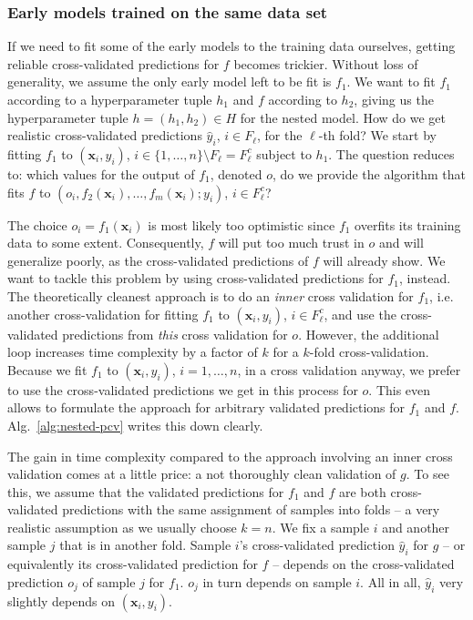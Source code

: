 \subsubsection{Early models trained on the same data set}
If we need to fit some of the early models to the training data ourselves, getting reliable 
cross-validated predictions
for $f$ becomes trickier. Without loss of generality, we assume the only early model left to be 
fit 
is $f_1$. We want to fit $f_1$ according to a hyperparameter tuple $h_1$ and $f$ according to $h_2$, 
giving us the hyperparameter tuple $h = (h_1, h_2) \in H$ for the nested model. How do 
we get realistic cross-validated predictions $\hat{y}_i$, $i \in F_\ell$, for the $\ell$-th fold? 
We start by fitting $f_1$ to $(\mathbf{x}_i, y_i)$, $i \in \{ 1, \ldots, n \} \setminus F_\ell = F_\ell^c$ 
subject to $h_1$.
The question reduces to: which values for the output of $f_1$, denoted $o$, do we provide the 
algorithm that fits $f$ to $(o_i, f_2(\mathbf{x}_i), \dots, f_m(\mathbf{x}_i); y_i)$, $i \in 
F_\ell^c$?

The choice $o_i = f_1(\mathbf{x}_i)$ is most likely too optimistic since $f_1$ overfits its training 
data to some extent. Consequently, $f$ will put too much trust in $o$ and will generalize poorly, 
as the cross-validated predictions of $f$ will already show. We want to tackle this problem by 
using cross-validated predictions for $f_1$, instead. The theoretically cleanest approach 
is to do an \textit{inner} cross validation for $f_1$, i.e. another cross-validation for fitting 
$f_1$ to $(\mathbf{x}_i, y_i)$, $i \in F_\ell^c$, and use the cross-validated predictions from \textit{this} 
cross validation for $o$. However, the additional loop increases time complexity by a factor of $k$ 
for a $k$-fold cross-validation. Because we fit $f_1$ to $(\mathbf{x}_i, y_i)$, $i = 1, \ldots, n$, 
in a cross validation anyway, we prefer to use the cross-validated predictions we get in this 
process for $o$. This even allows to formulate the approach for arbitrary validated predictions 
for $f_1$ and $f$. Alg.\ \ref{alg:nested-pcv} writes this down clearly.



The gain in time complexity compared to the approach involving an inner cross validation comes at a 
little price: a not thoroughly clean validation of $g$. To see this, we assume that the validated 
predictions for $f_1$ and $f$ are both cross-validated predictions with the same
assignment of samples into folds -- a very 
realistic assumption as we 
usually choose $k = n$. We fix a sample $i$ and another sample $j$ that is in another fold. 
Sample $i$'s cross-validated prediction $\hat{y}_i$ for $g$ -- or equivalently its cross-validated 
prediction for $f$ -- depends on the cross-validated 
prediction $o_j$ of sample $j$ for $f_1$. $o_j$ in turn depends on sample 
$i$. All in all, $\hat{y}_i$ very slightly depends on $(\mathbf{x}_i, y_i)$.

